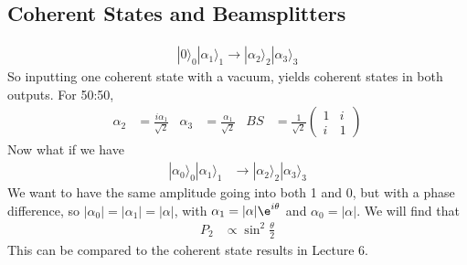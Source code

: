 \documentclass[a4paper, 11pt, normalem]{report}
\begin{document}
\section{Coherent States and Beamsplitters}
\begin{figure}[H]
    \centering
\end{figure}
\begin{align}
    |0\rangle_0|\alpha_1\rangle_1 \to |\alpha_2\rangle_2|\alpha_3\rangle_3 
\end{align}
So inputting one coherent state with a vacuum, yields coherent states in both outputs.
For 50:50,
\begin{align}
    \alpha_2 &= \frac{i\alpha_1}{\sqrt{2}} & \alpha_3 &= \frac{\alpha_1}{\sqrt{2}} & BS &= \frac{1}{\sqrt{2}}\begin{pmatrix} 1 & i \\ i & 1\end{pmatrix}
\end{align}
Now what if we have
\begin{align}
    |\alpha_0\rangle_0|\alpha_1\rangle_1 &\to |\alpha_2\rangle_2|\alpha_3\rangle_3 
\end{align}
We want to have the same amplitude going into both 1 and 0, but with a phase difference, so $|\alpha_0| = |\alpha_1| = |\alpha|$, with $\alpha_1 = |\alpha|\e^{i\theta}$ and $\alpha_0=|\alpha|$.
We will find that
\begin{align}
    P_2 &\propto \sin^2\frac{\theta}{2}
\end{align}
This can be compared to the coherent state results in Lecture 6. 

\chapter{}
\end{document}
